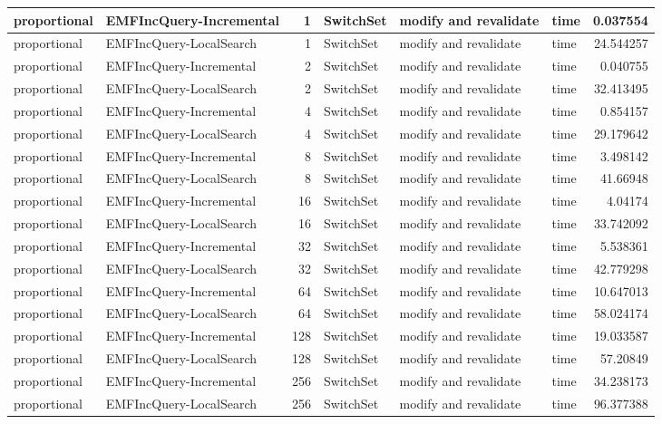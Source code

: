 \begin{table}
\begin{tabular}{| l | l | r | l | l | l | r |}
proportional & EMFIncQuery-Incremental & 1 & SwitchSet & modify and revalidate & time & 0.037554\\\hline
proportional & EMFIncQuery-LocalSearch & 1 & SwitchSet & modify and revalidate & time & 24.544257\\\hline
proportional & EMFIncQuery-Incremental & 2 & SwitchSet & modify and revalidate & time & 0.040755\\\hline
proportional & EMFIncQuery-LocalSearch & 2 & SwitchSet & modify and revalidate & time & 32.413495\\\hline
proportional & EMFIncQuery-Incremental & 4 & SwitchSet & modify and revalidate & time & 0.854157\\\hline
proportional & EMFIncQuery-LocalSearch & 4 & SwitchSet & modify and revalidate & time & 29.179642\\\hline
proportional & EMFIncQuery-Incremental & 8 & SwitchSet & modify and revalidate & time & 3.498142\\\hline
proportional & EMFIncQuery-LocalSearch & 8 & SwitchSet & modify and revalidate & time & 41.66948\\\hline
proportional & EMFIncQuery-Incremental & 16 & SwitchSet & modify and revalidate & time & 4.04174\\\hline
proportional & EMFIncQuery-LocalSearch & 16 & SwitchSet & modify and revalidate & time & 33.742092\\\hline
proportional & EMFIncQuery-Incremental & 32 & SwitchSet & modify and revalidate & time & 5.538361\\\hline
proportional & EMFIncQuery-LocalSearch & 32 & SwitchSet & modify and revalidate & time & 42.779298\\\hline
proportional & EMFIncQuery-Incremental & 64 & SwitchSet & modify and revalidate & time & 10.647013\\\hline
proportional & EMFIncQuery-LocalSearch & 64 & SwitchSet & modify and revalidate & time & 58.024174\\\hline
proportional & EMFIncQuery-Incremental & 128 & SwitchSet & modify and revalidate & time & 19.033587\\\hline
proportional & EMFIncQuery-LocalSearch & 128 & SwitchSet & modify and revalidate & time & 57.20849\\\hline
proportional & EMFIncQuery-Incremental & 256 & SwitchSet & modify and revalidate & time & 34.238173\\\hline
proportional & EMFIncQuery-LocalSearch & 256 & SwitchSet & modify and revalidate & time & 96.377388\\\hline

\end{tabular}
\end{table}
